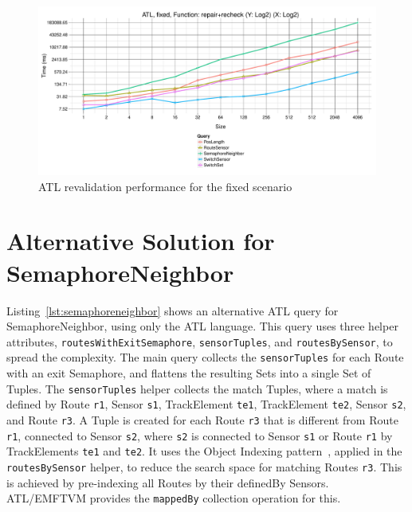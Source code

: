 \documentclass[submission,copyright,creativecommons]{eptcs}
\begin{document}
\begin{figure}[ht]
\centerline{
\includegraphics[width=15cm]{figures/fixed-ATL-GroupBy-Query-time-revalidation}}
\caption{ATL revalidation performance for the fixed scenario}
\label{fig:atl-recheck-performance}
\end{figure}


\appendix

\section{Alternative Solution for SemaphoreNeighbor}
\label{appendix:a}

Listing~\ref{lst:semaphoreneighbor} shows an alternative ATL query for SemaphoreNeighbor, using only the ATL language. This query uses three helper attributes, \texttt{routesWithExitSemaphore}, \texttt{sensorTuples}, and \texttt{routesBySensor}, to spread the complexity. The main query collects the \texttt{sensorTuples} for each Route with an exit Semaphore, and flattens the resulting Sets into a single Set of Tuples. The \texttt{sensorTuples} helper collects the match Tuples, where a match is defined by Route \texttt{r1}, Sensor \texttt{s1}, TrackElement \texttt{te1}, TrackElement \texttt{te2}, Sensor \texttt{s2}, and Route \texttt{r3}. A Tuple is created for each Route \texttt{r3} that is different from Route \texttt{r1}, connected to Sensor \texttt{s2}, where \texttt{s2} is connected to Sensor \texttt{s1} or Route \texttt{r1} by TrackElements \texttt{te1} and \texttt{te2}. It uses the Object Indexing pattern~\cite{conf/icsea/Lano2011}, applied in the \texttt{routesBySensor} helper, to reduce the search space for matching Routes \texttt{r3}. This is achieved by pre-indexing all Routes by their definedBy Sensors. ATL/EMFTVM provides the \texttt{mappedBy} collection operation for this.
\end{document}
